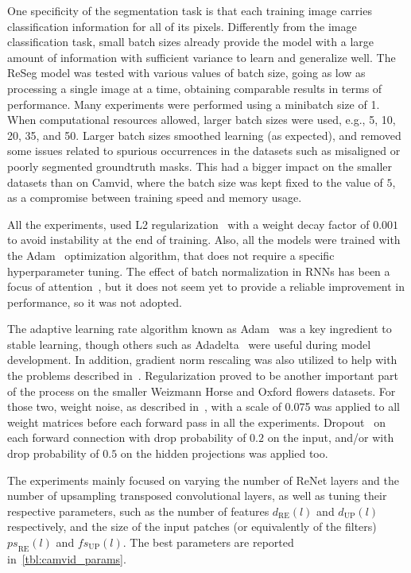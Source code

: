 One specificity of the segmentation task is that each training image carries
classification information for all of its pixels. Differently from the image
classification task, small batch sizes already provide the model with a large
amount of information with sufficient variance to learn and generalize well.
The ReSeg model was tested with various values of batch size, going as low as
processing a single image at a time, obtaining comparable results in terms of
performance. Many experiments were performed using a minibatch size of 1. When
computational resources allowed, larger batch sizes were used, e.g., 5, 10,
20, 35, and 50. Larger batch sizes smoothed learning (as expected), and removed
some issues related to spurious occurrences in the datasets such as misaligned
or poorly segmented groundtruth masks. This had a bigger impact on the smaller
datasets than on Camvid, where the batch size was kept fixed to the value of
$5$, as a compromise between training speed and memory usage.

All the experiments, used L2 regularization~\citep{Krogh92asimple} with a
weight decay factor of $0.001$ to avoid instability at the end of training.
Also, all the models were trained with the Adam~\citep{kingma2014adam}
optimization algorithm, that does not require a specific hyperparameter tuning.
The effect of batch normalization in RNNs has been a focus of
attention~\citep{Laurent2015}, but it does not seem yet to provide a
reliable improvement in performance, so it was not adopted.

The adaptive learning rate algorithm known as Adam~\citep{Kingma2014} was a
key ingredient to stable learning, though others such as
Adadelta~\citep{Zeiler-2012} were useful during model development. In addition,
gradient norm rescaling was also utilized to help with the problems described
in~\citep{bengio2013advances}. Regularization proved to be another important
part of the process on the smaller Weizmann Horse and Oxford flowers datasets.
For those two, weight noise, as described in~\citep{Graves2011}, with a scale
of 0.075 was applied to all weight matrices before each forward pass in all the
experiments. Dropout~\citep{Srivastava14} on each forward connection with drop
probability of $0.2$ on the input, and/or with drop probability of $0.5$ on the
hidden projections was applied too.

The experiments mainly focused on varying the number of ReNet layers and the
number of upsampling transposed convolutional layers, as well as tuning their
respective parameters, such as the number of features $d_{\text{RE}}(l)$ and
$d_{\text{UP}}(l)$ respectively, and the size of the input patches (or
equivalently of the filters) ${ps}_{\text{RE}}(l)$ and ${fs}_{\text{UP}}(l)$.
The best parameters are reported in~\autoref{tbl:camvid_params}.


